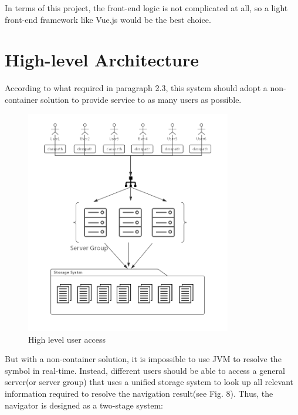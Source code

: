 \documentclass[runningheads]{llncs}
\begin{document}
In terms of this project, the front-end logic is not complicated at all, so a light front-end framework like Vue.js would be the best choice. 

\section{High-level Architecture}

According to what required in paragraph 2.3, this system should adopt a non-container solution to provide service to as many users as possible. 

\begin{figure}[H]
	\centering
	\includegraphics[width=9cm]{pic/high-level-diagram.png}
	\caption{High level user access}
	\label{High level user access}
\end{figure}

But with a non-container solution, it is impossible to use JVM to resolve the symbol in real-time. Instead, different users should be able to access a general server(or server group) that uses a unified storage system to look up all relevant information required to resolve the navigation result(see Fig. 8). Thus, the navigator is designed as a two-stage system:
\end{document}
